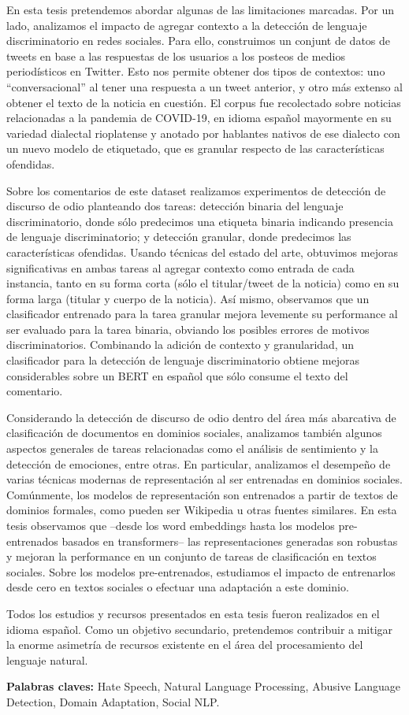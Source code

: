 {En esta tesis pretendemos abordar algunas de las limitaciones marcadas. Por un lado, analizamos el impacto de agregar contexto a la detección de lenguaje discriminatorio en redes sociales. Para ello, construimos un conjunt de datos de tweets en base a las respuestas de los usuarios a los posteos de medios periodísticos en Twitter. Esto nos permite obtener dos tipos de contextos: uno “conversacional” al tener una respuesta a un tweet anterior, y otro más extenso al obtener el texto de la noticia en cuestión. El corpus fue recolectado sobre noticias relacionadas a la pandemia de COVID-19, en idioma español mayormente en su variedad dialectal rioplatense y anotado por hablantes nativos de ese dialecto con un nuevo modelo de etiquetado, que es granular respecto de las características ofendidas.

Sobre los comentarios de este dataset realizamos experimentos de detección de discurso de odio planteando dos tareas: detección binaria del lenguaje discriminatorio, donde sólo predecimos una etiqueta binaria indicando presencia de lenguaje discriminatorio; y detección granular, donde predecimos las características ofendidas. Usando técnicas del estado del arte, obtuvimos mejoras significativas en ambas tareas al agregar contexto como entrada de cada instancia, tanto en su forma corta (sólo el titular/tweet de la noticia) como en su forma larga (titular y cuerpo de la noticia). Así mismo, observamos que un clasificador entrenado para la tarea granular mejora levemente su performance al ser evaluado para la tarea binaria, obviando los posibles errores de motivos discriminatorios. Combinando la adición de contexto y granularidad, un clasificador para la detección de lenguaje discriminatorio obtiene mejoras considerables sobre un BERT en español que sólo consume el texto del comentario.

Considerando la detección de discurso de odio dentro del área más abarcativa de clasificación de documentos en dominios sociales, analizamos también algunos aspectos generales de tareas relacionadas como el análisis de sentimiento y la detección de emociones, entre otras. En particular, analizamos el desempeño de varias técnicas modernas de representación al ser entrenadas en dominios sociales. Comúnmente, los modelos de representación son entrenados a partir de textos de dominios formales, como pueden ser Wikipedia u otras fuentes similares. En esta tesis observamos que –desde los word embeddings hasta los modelos pre-entrenados basados en transformers– las representaciones generadas son robustas y mejoran la performance en un conjunto de tareas de clasificación en textos sociales. Sobre los modelos pre-entrenados, estudiamos el impacto de entrenarlos desde cero en textos sociales o efectuar una adaptación a este dominio.

Todos los estudios y recursos presentados en esta tesis fueron realizados en el idioma español. Como un objetivo secundario, pretendemos contribuir a mitigar la enorme asimetría de recursos existente en el área del procesamiento del lenguaje natural.


}


\bigskip

\noindent\textbf{Palabras claves:} Hate Speech, Natural Language Processing, Abusive Language Detection, Domain Adaptation, Social NLP.